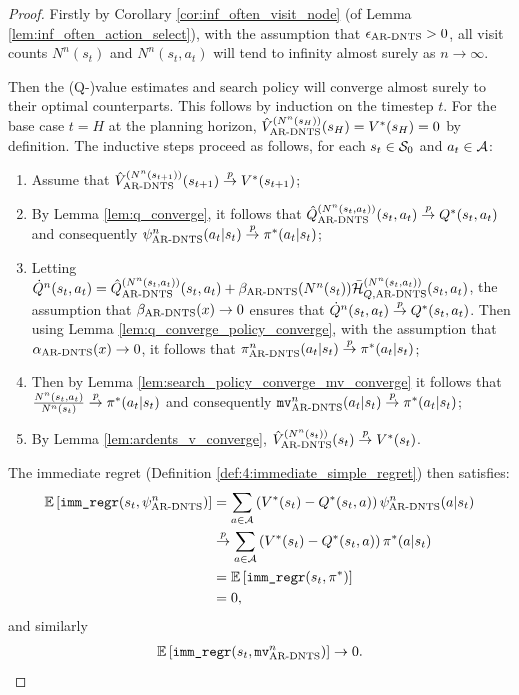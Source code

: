     \thrmARDENTS*
    \begin{proof}
        Firstly by Corollary \ref{cor:inf_often_visit_node} (of Lemma \ref{lem:inf_often_action_select}), with the assumption that ${\epsilon_{{\textnormal{AR-DNTS}}}} > 0$, all visit counts $N^n(s_t)$ and $N^n(s_t,a_t)$ will tend to infinity almost surely as $n\rightarrow\infty$.

        Then the (Q-)value estimates and search policy will converge almost surely to their optimal counterparts. This follows by induction on the timestep $t$. For the base case $t=H$ at the planning horizon, ${\hat{V}^{(N^n(s_H))}_{{\textnormal{AR-DNTS}}}}(s_H) = V^*(s_H) = 0$ by definition. The inductive steps proceed as follows, for each $s_t\in\mathcal{S}_0$ and $a_t\in\mathcal{A}$:
        \begin{enumerate}
            \item \label{itm:induction1}
                Assume that ${\hat{V}^{(N^n(s_{t+1}))}_{{\textnormal{AR-DNTS}}}}(s_{t+1})\overset{p}{\to} V^*(s_{t+1})$;
            \item \label{itm:induction2}
                By Lemma \ref{lem:q_converge}, it follows that ${\hat{Q}^{(N^n(s_t,a_t))}_{{\textnormal{AR-DNTS}}}}(s_t,a_t) \overset{p}{\to} Q^*(s_t,a_t)$ and consequently ${\psi^{n}_{{\textnormal{AR-DNTS}}}}(a_t|s_t)\overset{p}{\to}\pi^*(a_t|s_t)$;
            \item \label{itm:induction3}
                Letting $\dot{Q}^n(s_t,a_t) = {\hat{Q}^{(N^n(s_t,a_t))}_{{\textnormal{AR-DNTS}}}}(s_t,a_t) + {\beta_{{\textnormal{AR-DNTS}}}}(N^n(s_t)){\bar{\mathcal{H}}^{(N^n(s_t,a_t))}_{Q,{\textnormal{AR-DNTS}}}}(s_t,a_t)$, the assumption that ${\beta_{{\textnormal{AR-DNTS}}}}(x)\rightarrow 0$ ensures that $\dot{Q}^n(s_t,a_t)\overset{p}{\to} Q^*(s_t,a_t)$. Then using Lemma \ref{lem:q_converge_policy_converge}, with the assumption that ${\alpha_{{\textnormal{AR-DNTS}}}}(x)\rightarrow 0$, it follows that ${\pi^{n}_{{\textnormal{AR-DNTS}}}}(a_t|s_t)\overset{p}{\to} \pi^*(a_t|s_t)$;
            \item \label{itm:induction4}
                Then by Lemma \ref{lem:search_policy_converge_mv_converge} it follows that $\frac{N^n(s_t,a_t)}{N^n(s_t)} \overset{p}{\to} \pi^*(a_t|s_t)$ and consequently ${\textup{\texttt{mv}}^{n}_{{\textnormal{AR-DNTS}}}}(a_t|s_t)\overset{p}{\to} \pi^*(a_t|s_t)$;
            \item \label{itm:induction5}
                By Lemma \ref{lem:ardents_v_converge}, ${\hat{V}^{(N^n(s_t))}_{{\textnormal{AR-DNTS}}}}(s_t)\overset{p}{\to} V^*(s_t)$.
        \end{enumerate}

        The immediate regret (Definition \ref{def:4:immediate_simple_regret}) then satisfies:
        \begin{align}
            \mathbb{E}\left[{\textnormal{\texttt{imm\_regr}}}(s_t,{\psi^{n}_{{\textnormal{AR-DNTS}}}})\right] 
                &= \sum_{a\in\mathcal{A}} \left(V^*(s_t)-Q^*(s_t,a)\right) {\psi^{n}_{{\textnormal{AR-DNTS}}}}(a|s_t) \\
                &\overset{p}{\to} \sum_{a\in\mathcal{A}} \left(V^*(s_t)-Q^*(s_t,a)\right) \pi^*(a|s_t) \\
                &= \mathbb{E}\left[{\textnormal{\texttt{imm\_regr}}}(s_t,\pi^*)\right] \\
                &= 0,
        \end{align}
        and similarly
        \begin{align}
            \mathbb{E}\left[{\textnormal{\texttt{imm\_regr}}}(s_t,{\textup{\texttt{mv}}^{n}_{{\textnormal{AR-DNTS}}}})\right]\rightarrow 0.
        \end{align}


\end{proof}
